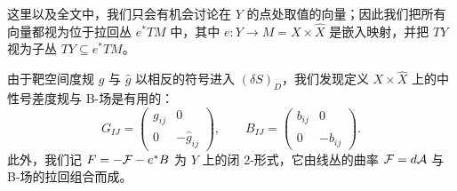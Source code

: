 这里以及全文中，我们只会有机会讨论在 $Y$ 的点处取值的向量；因此我们把所有向量都视为位于拉回丛 $e^*TM$ 中，其中 $e:Y\to M=X\times\hat X$ 是嵌入映射，并把 $TY$ 视为子丛 $TY\subseteq e^*TM$。

由于靶空间度规 $g$ 与 $\hat g$ 以相反的符号进入 $(\delta S)_D$，我们发现定义 $X\times\hat X$ 上的中性号差度规与 B-场是有用的：
\[
G_{IJ}=\begin{pmatrix}g_{ij}&0\\ 0&-\hat g_{ij}\end{pmatrix},\qquad
B_{IJ}=\begin{pmatrix}b_{ij}&0\\ 0&-\hat b_{ij}\end{pmatrix}.
\]
此外，我们记 $F=-\mathcal{F}-e^*B$ 为 $Y$ 上的闭 2-形式，它由线丛的曲率 $\mathcal{F}=d\mathcal{A}$ 与 B-场的拉回组合而成。
